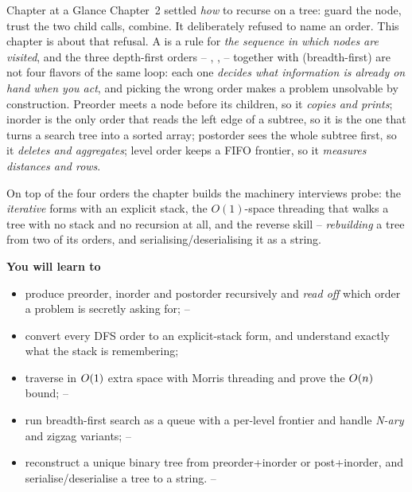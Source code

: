 
\begin{chaptertheorybox}{Chapter at a Glance}
Chapter~2 settled \emph{how} to recurse on a tree: guard the node, trust the two
child calls, combine. It deliberately refused to name an order. This chapter is
about that refusal. A  is a rule for \emph{the sequence in which
nodes are visited}, and the three depth-first orders -- ,
,  -- together with  (breadth-first)
are not four flavors of the same loop: each one \emph{decides what information is
already on hand when you act}, and picking the wrong order makes a problem unsolvable
by construction. Preorder meets a node before its children, so it \emph{copies and
prints}; inorder is the only order that reads the left edge of a subtree, so it is
the one that turns a search tree into a sorted array; postorder sees the whole
subtree first, so it \emph{deletes and aggregates}; level order keeps a FIFO
frontier, so it \emph{measures distances and rows}.

On top of the four orders the chapter builds the machinery interviews probe: the
\emph{iterative} forms with an explicit stack, the $O(1)$-space 
threading that walks a tree with no stack and no recursion at all, and the reverse
skill -- \emph{rebuilding} a tree from two of its orders, and serialising/deserialising
it as a string.

\textbf{You will learn to}
\begin{itemize}[nosep]
  \item produce preorder, inorder and postorder recursively and \emph{read off}
        which order a problem is secretly asking for;                        \hfill{}--
  \item convert every DFS order to an explicit-stack form, and understand exactly
        what the stack is remembering;                                       \hfill{}
  \item traverse in $O(1)$ extra space with Morris threading and prove the
        $O(n)$ bound;                                                    \hfill{}--
  \item run breadth-first search as a queue with a per-level frontier and handle
        \emph{N-ary} and zigzag variants;                                    \hfill{}--
  \item reconstruct a unique binary tree from preorder+inorder or post+inorder,
        and serialise/deserialise a tree to a string.                        \hfill{}--
\end{itemize}


\end{chaptertheorybox}
